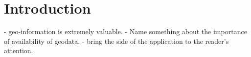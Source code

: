 \chapter{Introduction}

- geo-information is extremely valuable.
- Name something about the importance of availability of geodata.
- bring the side of the application to the reader's attention. 






